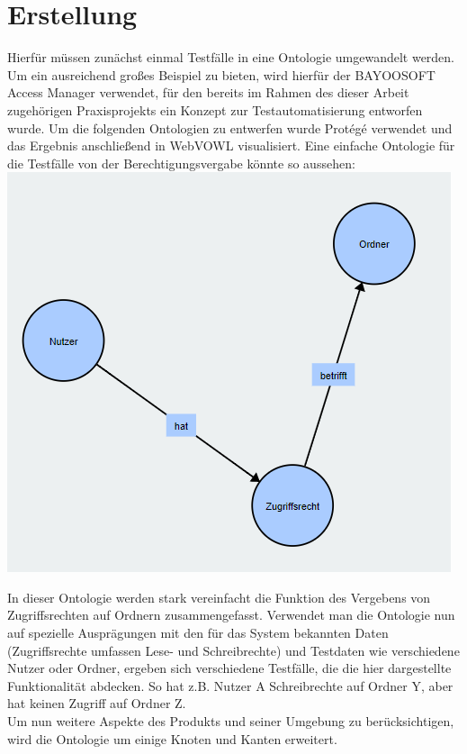 \section{Erstellung}
Hierfür müssen zunächst einmal Testfälle in eine Ontologie umgewandelt werden. Um ein ausreichend großes Beispiel zu bieten, wird hierfür der BAYOOSOFT Access Manager verwendet, für den bereits im Rahmen des dieser Arbeit zugehörigen Praxisprojekts ein Konzept zur Testautomatisierung entworfen wurde. Um die folgenden Ontologien zu entwerfen wurde Protégé verwendet und das Ergebnis anschließend in WebVOWL visualisiert. \newline
Eine einfache Ontologie für die Testfälle von der Berechtigungsvergabe könnte so aussehen:\\

\includegraphics{Thesis/Images/OntologySmall.png}

In dieser Ontologie werden stark vereinfacht die Funktion des Vergebens von Zugriffsrechten auf Ordnern zusammengefasst. Verwendet man die Ontologie nun auf spezielle Ausprägungen mit den für das System bekannten Daten (Zugriffsrechte umfassen Lese- und Schreibrechte) und Testdaten wie verschiedene Nutzer oder Ordner, ergeben sich verschiedene Testfälle, die die hier dargestellte Funktionalität abdecken. So hat z.B. Nutzer A Schreibrechte auf Ordner Y, aber hat keinen Zugriff auf Ordner Z. \\

Um nun weitere Aspekte des Produkts und seiner Umgebung zu berücksichtigen, wird die Ontologie um einige Knoten und Kanten erweitert. \\

